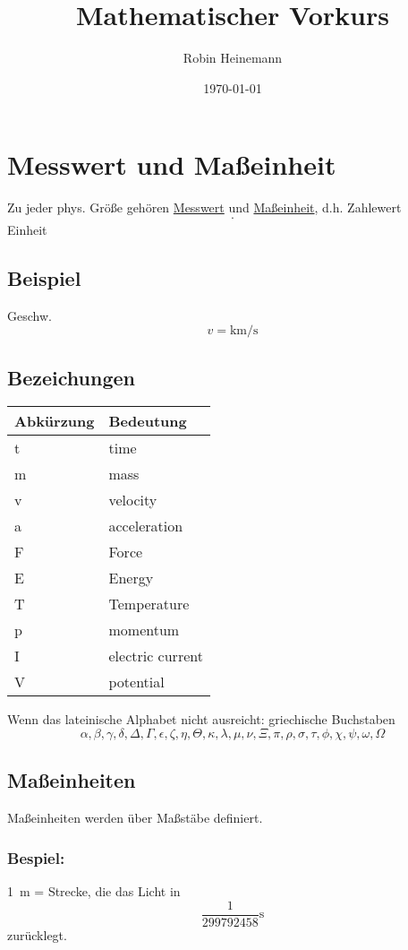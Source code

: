 \documentclass[11pt]{article}
\author{Robin Heinemann}
\date{\today}
\title{Mathematischer Vorkurs}
\begin{document}
\maketitle
\tableofcontents


\section{Messwert und Maßeinheit}
\label{sec-1}
Zu jeder phys. Größe gehören \uline{Messwert} und \uline{Maßeinheit}, d.h. Zahlewert $$\cdot$$ Einheit

\subsection{Beispiel}
\label{sec-1-1}
Geschw. $$v = \si{\kilo\meter\per\second}$$

\subsection{Bezeichungen}
\label{sec-1-2}
\begin{center}
\begin{tabular}{ll}
Abkürzung & Bedeutung\\
\hline
t & time\\
m & mass\\
v & velocity\\
a & acceleration\\
F & Force\\
E & Energy\\
T & Temperature\\
p & momentum\\
I & electric current\\
V & potential\\
\end{tabular}
\end{center}

Wenn das lateinische  Alphabet nicht ausreicht: griechische Buchstaben
$$\alpha, \beta, \gamma, \delta, \Delta, \Gamma, \epsilon, \zeta, \eta, \Theta, \kappa, \lambda, \mu, \nu, \Xi, \pi, \rho, \sigma, \tau, \phi, \chi, \psi, \omega, \Omega$$

\subsection{Maßeinheiten}
\label{sec-1-3}
Maßeinheiten werden über Maßstäbe definiert.

\subsubsection{Bespiel:}
\label{sec-1-3-1}
\SI{1}{\meter} = Strecke, die das Licht in $$\frac{1}{299792458}\si{\second}$$ zurücklegt.
\end{document}
